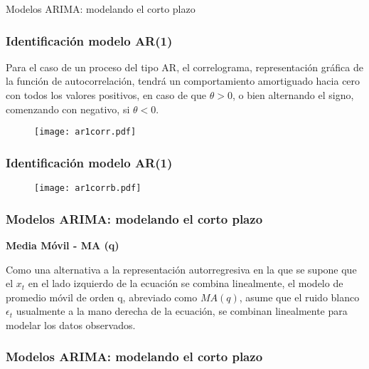 \documentclass[spanish,xcolor=table]{beamer}
\begin{document}
\begin{section}{Modelos ARIMA: modelando el corto plazo}
\begin{frame}
\end{frame}

\begin{frame}
\frametitle{Identificaci\'on modelo AR(1) }

Para el caso de un proceso del tipo AR, el correlograma, representaci\'on gr\'afica de la funci\'on de autocorrelaci\'on, tendr\'a un
comportamiento amortiguado hacia cero con todos los valores positivos, en caso de que $\theta > 0$, o bien alternando el signo, comenzando con negativo, si  $\theta < 0$.

\begin{figure}[t!]
\texttt{[image: ar1corr.pdf]}
\end{figure}


\end{frame}
\begin{frame}
\frametitle{Identificaci\'on modelo AR(1) }
 
\begin{figure}[t!]
\texttt{[image: ar1corrb.pdf]}
\end{figure}

\end{frame}
\begin{frame}
\frametitle{Modelos ARIMA: modelando el corto plazo}

\textbf{Media M\'ovil - MA (q)}

Como una alternativa a la representaci\'on autorregresiva en la que se supone que el $x_t$ en el lado izquierdo de la ecuaci\'on se combina linealmente, el modelo de promedio m\'ovil de orden q, abreviado como $MA (q)$, asume que el ruido blanco $\epsilon_t$ usualmente a la mano derecha de la ecuaci\'on, se combinan linealmente para modelar los datos observados.

 
\end{frame}

\begin{frame}
\frametitle{Modelos ARIMA: modelando el corto plazo}

\end{frame}
\end{section}
\end{document}
